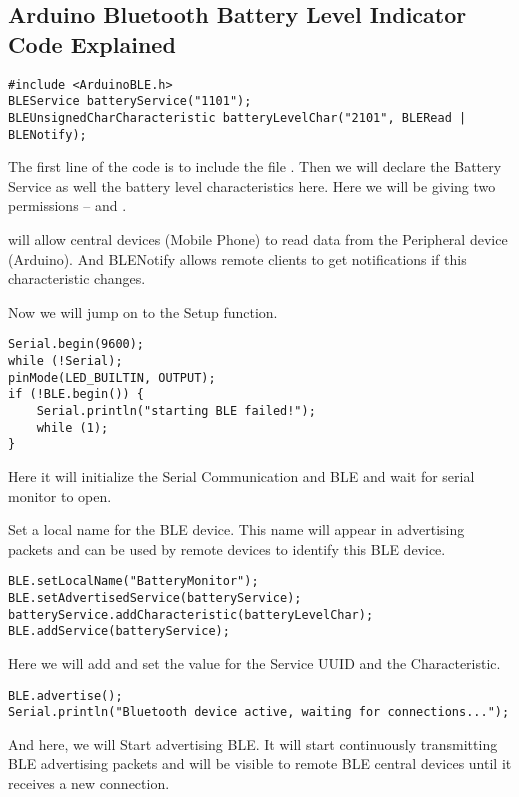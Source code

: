\subsection{Arduino Bluetooth Battery Level Indicator Code Explained}

\begin{lstlisting}
#include <ArduinoBLE.h>
BLEService batteryService("1101");
BLEUnsignedCharCharacteristic batteryLevelChar("2101", BLERead | BLENotify);
\end{lstlisting}

The first line of the code is to include the file . Then we will declare the Battery Service as well the battery level characteristics here. Here we will be giving two permissions  --  and . 

 will allow central devices (Mobile Phone) to read data from the Peripheral device (Arduino).  And BLENotify allows remote clients to get notifications if this characteristic changes. 

Now we will jump on to the Setup function.

\begin{lstlisting}
Serial.begin(9600);
while (!Serial);
pinMode(LED_BUILTIN, OUTPUT);
if (!BLE.begin()) {
    Serial.println("starting BLE failed!");
    while (1);
}
\end{lstlisting}

Here it will initialize the Serial Communication and BLE and wait for serial monitor to open. 

Set a local name for the BLE device. This name will appear in advertising packets and can be used by remote devices to identify this BLE device.

\begin{lstlisting}
BLE.setLocalName("BatteryMonitor");
BLE.setAdvertisedService(batteryService);
batteryService.addCharacteristic(batteryLevelChar);
BLE.addService(batteryService);
\end{lstlisting}

Here we will add and set the value for the Service UUID and the Characteristic.

\begin{lstlisting}
BLE.advertise();
Serial.println("Bluetooth device active, waiting for connections...");
\end{lstlisting}

And here, we will Start advertising BLE.  It will start continuously transmitting BLE advertising packets and will be visible to remote BLE central devices until it receives a new connection.

